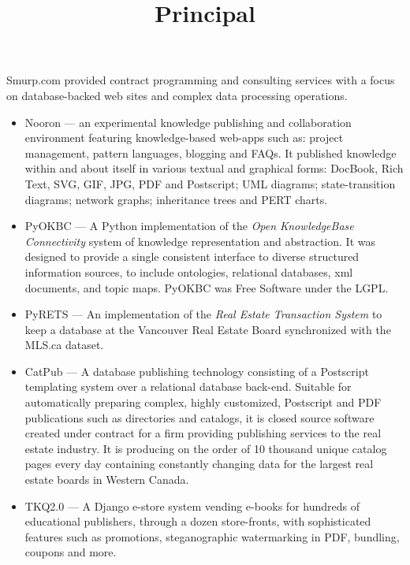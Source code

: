 \begin{resume}
\begin{position}
\end{position}


\title{ Principal }

\begin{position}
Smurp.com provided contract programming and consulting services with a focus
on database-backed web sites and complex data processing operations.

\begin{itemize}
  \item Nooron --- an experimental knowledge publishing and collaboration
    environment featuring knowledge-based web-apps such as:
    project management, pattern languages, blogging and FAQs.
    It published knowledge within and about itself in various textual 
    and graphical forms:
    DocBook, Rich Text, SVG, GIF, JPG, PDF and Postscript;
    UML diagrams; state-transition diagrams; network graphs; 
    inheritance trees and PERT charts.

  \item PyOKBC --- A Python implementation of the 
     \emph{Open KnowledgeBase Connectivity}
  system of knowledge representation and abstraction.
  It was designed to provide a single consistent interface to diverse structured
  information sources, to include ontologies, relational databases,
  xml documents, and topic maps.  PyOKBC was Free Software under the LGPL.

  \item PyRETS --- An implementation of the \emph{Real Estate Transaction System}
  to keep a database at the Vancouver Real Estate Board synchronized with 
  the MLS.ca dataset.

  \item CatPub --- A database publishing technology consisting of a
  Postscript templating system over a relational database back-end.
  Suitable for automatically preparing complex, highly customized,
  Postscript and PDF publications such as directories and catalogs,
  it is closed source software created under contract for a firm
  providing publishing services to the real estate industry.  
  It is producing on the order of 10 thousand unique catalog pages 
  every day containing constantly changing data for the largest 
  real estate boards in Western Canada.

  \item TKQ2.0 --- A Django e-store system vending e-books for hundreds
  of educational publishers, through a dozen store-fronts, with sophisticated 
  features such as promotions, steganographic watermarking in PDF, bundling,
  coupons and more.


\end{itemize}
\end{position}
\end{resume}
